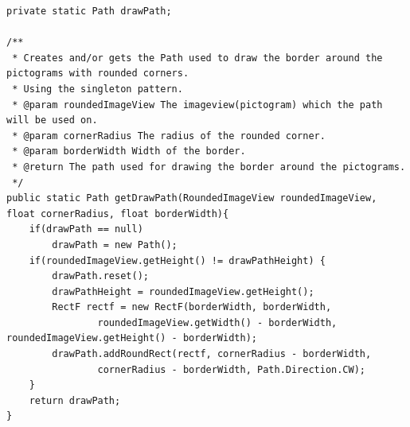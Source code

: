\begin{lstlisting}[float, floatplacement=h, caption={One of the singletons used to solve this task.}, label={lst:singleton_example}] 
private static Path drawPath;

/**
 * Creates and/or gets the Path used to draw the border around the pictograms with rounded corners.
 * Using the singleton pattern.
 * @param roundedImageView The imageview(pictogram) which the path will be used on.
 * @param cornerRadius The radius of the rounded corner.
 * @param borderWidth Width of the border.
 * @return The path used for drawing the border around the pictograms.
 */
public static Path getDrawPath(RoundedImageView roundedImageView, float cornerRadius, float borderWidth){
    if(drawPath == null)
        drawPath = new Path();
    if(roundedImageView.getHeight() != drawPathHeight) {
        drawPath.reset();
        drawPathHeight = roundedImageView.getHeight();
        RectF rectf = new RectF(borderWidth, borderWidth,
                roundedImageView.getWidth() - borderWidth, roundedImageView.getHeight() - borderWidth);
        drawPath.addRoundRect(rectf, cornerRadius - borderWidth,
                cornerRadius - borderWidth, Path.Direction.CW);
    }
    return drawPath;
}
\end{lstlisting} 

